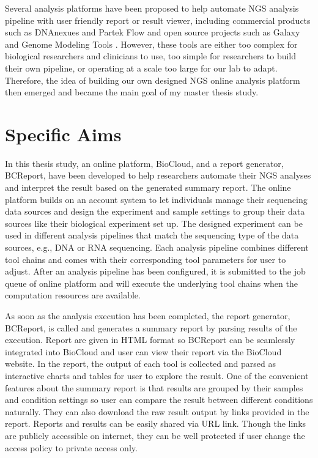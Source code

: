 Several analysis platforms have been proposed to help automate NGS analysis
pipeline with user friendly report or result viewer, including commercial
products such as DNAnexues \cite{:dnanexus} and Partek Flow \cite{:partek} and
open source projects such as Galaxy \cite{goecks2010:galaxy} and Genome
Modeling Tools \cite{griffith2015:genome}. However, these tools are either too
complex for biological researchers and clinicians to use, too simple for
researchers to build their own pipeline, or operating at a scale too large for
our lab to adapt. Therefore, the idea of building our own designed NGS online
analysis platform then emerged and became the main goal of my master thesis
study.


\section{Specific Aims}
\label{s:specific-aim}

%
%

In this thesis study, an online platform, BioCloud, and a report generator,
BCReport, have been developed to help researchers automate their NGS analyses
and interpret the result based on the generated summary report. The online
platform builds on an account system to let individuals manage their sequencing
data sources and design the experiment and sample settings to group their data
sources like their biological experiment set up. The designed experiment can be
used in different analysis pipelines that match the sequencing type of the data
sources, e.g., DNA or RNA sequencing. Each analysis pipeline combines different
tool chains and comes with their corresponding tool parameters for user to
adjust. After an analysis pipeline has been configured, it is submitted to the
job queue of online platform and will execute the underlying tool chains when
the computation resources are available.

As soon as the analysis execution has been completed, the report generator,
BCReport, is called and generates a summary report by parsing results of the
execution. Report are given in HTML format so BCReport can be seamlessly
integrated into BioCloud and user can view their report via the BioCloud
website. In the report, the output of each tool is collected and parsed as
interactive charts and tables for user to explore the result. One of the
convenient features about the summary report is that results are grouped by
their samples and condition settings so user can compare the result between
different conditions naturally. They can also download the raw result output by
links provided in the report. Reports and results can be easily shared via URL
link. Though the links are publicly accessible on internet, they can be well
protected if user change the access policy to private access only.



